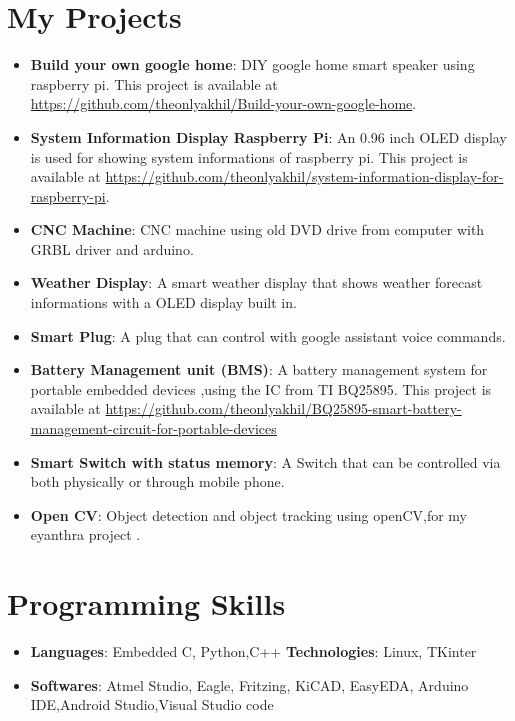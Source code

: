 \documentclass[letterpaper,11pt]{article}
\newcommand{\resumeItem}[2]{
  \item\small{
    \textbf{#1}{: #2 \vspace{-2pt}}
  }
}
\newcommand{\resumeSubItem}[2]{\resumeItem{#1}{#2}\vspace{-4pt}}
\newcommand{\resumeSubHeadingListStart}{\begin{itemize}[leftmargin=*]}
\newcommand{\resumeSubHeadingListEnd}{\end{itemize}}
\begin{document}
\section{My Projects}
  \resumeSubHeadingListStart
    \resumeSubItem{Build your own google home}
      { DIY google home smart speaker using raspberry pi. This project is available at \url{https://github.com/theonlyakhil/Build-your-own-google-home}.}
       \resumeSubItem{System Information Display Raspberry Pi}
      {An 0.96 inch OLED display is used for showing system informations of raspberry pi. This project is available at \url{https://github.com/theonlyakhil/system-information-display-for-raspberry-pi}.}
      \resumeSubItem{CNC Machine}
      {CNC machine using old DVD drive from computer with GRBL driver and arduino.}
      \resumeSubItem{Weather Display}
      {A smart weather display that shows weather forecast informations with a OLED display built in.}
      \resumeSubItem{Smart Plug}
      {A plug that can control with google assistant voice commands.}
      \resumeSubItem{Battery Management unit (BMS)}
      {A battery management system for portable embedded devices ,using the IC from TI BQ25895. This project is available at \url{https://github.com/theonlyakhil/BQ25895-smart-battery-management-circuit-for-portable-devices}}
      \resumeSubItem{Smart Switch with status memory}
      {A Switch that can be controlled via both physically or through mobile phone.}
      \resumeSubItem{Open CV}
      {Object detection and object tracking using openCV,for my eyanthra project .}
      
  \resumeSubHeadingListEnd

\section{Programming Skills}
  \resumeSubHeadingListStart
    \item{
      \textbf{Languages}{: Embedded C, Python,C++}
      \hfill
      \textbf{Technologies}{: Linux, TKinter}
    }
    \item{
      \textbf{Softwares}{: Atmel Studio, Eagle, Fritzing, KiCAD, EasyEDA, Arduino IDE,Android Studio,Visual Studio code}
    }

  \resumeSubHeadingListEnd
  
\end{document}
